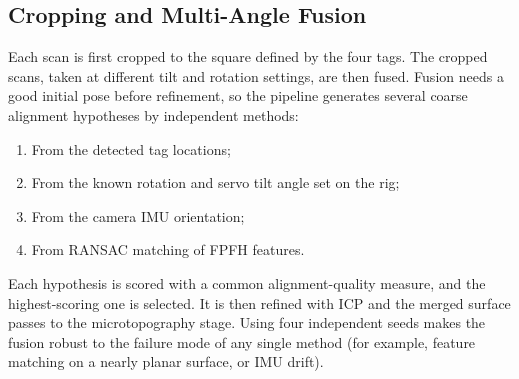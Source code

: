 \subsection{Cropping and Multi-Angle Fusion}
Each scan is first cropped to the square defined by the four tags. The cropped scans, taken at different tilt and rotation settings, are then fused. Fusion needs a good initial pose before refinement, so the pipeline generates several coarse alignment hypotheses by independent methods:
\begin{enumerate}[noitemsep]
	\item From the detected tag locations;
	\item From the known rotation and servo tilt angle set on the rig;
	\item From the camera IMU orientation;
	\item From RANSAC matching of FPFH features.
\end{enumerate}
Each hypothesis is scored with a common alignment-quality measure, and the highest-scoring one is selected. It is then refined with ICP and the merged surface passes to the microtopography stage. Using four independent seeds makes the fusion robust to the failure mode of any single method (for example, feature matching on a nearly planar surface, or IMU drift).

%		
%		
%		
%		
%		
%		
%		

